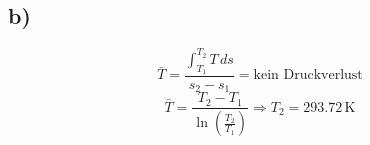 

\subsection*{b)}
\[
\bar{T} = \frac{\int_{T_1}^{T_2} T \, ds}{s_2 - s_1} = \text{kein Druckverlust}
\]
\[
\bar{T} = \frac{T_2 - T_1}{\ln \left( \frac{T_2}{T_1} \right)} \Rightarrow T_2 = 293.72 \, \text{K}
\]